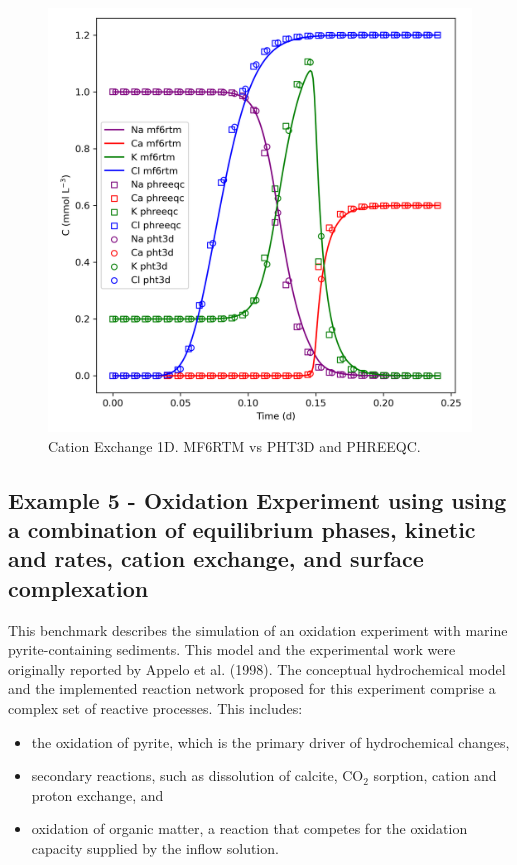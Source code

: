 \documentclass{article}
\begin{document}
\begin{figure}[H]
\centering

    \includegraphics[width=0.8\linewidth]{figures/ex4.png}
\caption{Cation Exchange 1D. MF6RTM vs PHT3D and PHREEQC.}
\label{fig:ex4}
\end{figure}


\subsection{Example 5 - Oxidation Experiment using using a combination of equilibrium phases, kinetic and rates, cation exchange, and surface complexation}
This benchmark describes the simulation of an oxidation experiment with marine pyrite-containing sediments. This model and the experimental work were originally reported by Appelo et al. (1998). The conceptual hydrochemical model and the implemented reaction network proposed for this experiment comprise a complex set of reactive processes. This includes:

\begin{itemize}
    \item the oxidation of pyrite, which is the primary driver of hydrochemical changes,
    \item secondary reactions, such as dissolution of calcite, CO$_2$ sorption, cation and proton exchange, and
    \item oxidation of organic matter, a reaction that competes for the oxidation capacity supplied by the inflow solution.
\end{itemize}
\end{document}
